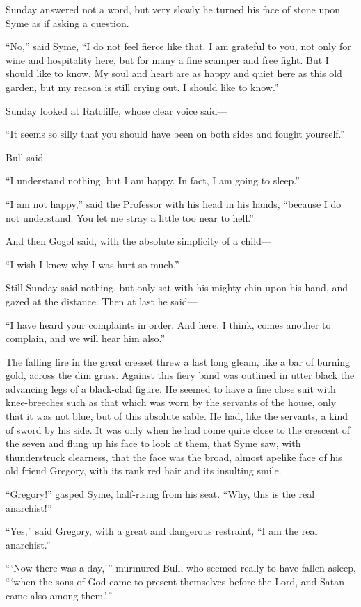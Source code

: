 Sunday answered not a word, but very slowly he turned his face of stone upon Syme as if asking a question.

“No,” said Syme, “I do not feel fierce like that. I am grateful to you, not only for wine and hospitality here, but for many a fine scamper and free fight. But I should like to know. My soul and heart are as happy and quiet here as this old garden, but my reason is still crying out. I should like to know.”

Sunday looked at Ratcliffe, whose clear voice said⁠—

“It seems so silly that you should have been on both sides and fought yourself.”

Bull said⁠—

“I understand nothing, but I am happy. In fact, I am going to sleep.”

“I am not happy,” said the Professor with his head in his hands, “because I do not understand. You let me stray a little too near to hell.”

And then Gogol said, with the absolute simplicity of a child⁠—

“I wish I knew why I was hurt so much.”

Still Sunday said nothing, but only sat with his mighty chin upon his hand, and gazed at the distance. Then at last he said⁠—

“I have heard your complaints in order. And here, I think, comes another to complain, and we will hear him also.”

The falling fire in the great cresset threw a last long gleam, like a bar of burning gold, across the dim grass. Against this fiery band was outlined in utter black the advancing legs of a black-clad figure. He seemed to have a fine close suit with knee-breeches such as that which was worn by the servants of the house, only that it was not blue, but of this absolute sable. He had, like the servants, a kind of sword by his side. It was only when he had come quite close to the crescent of the seven and flung up his face to look at them, that Syme saw, with thunderstruck clearness, that the face was the broad, almost apelike face of his old friend Gregory, with its rank red hair and its insulting smile.

“Gregory!” gasped Syme, half-rising from his seat. “Why, this is the real anarchist!”

“Yes,” said Gregory, with a great and dangerous restraint, “I am the real anarchist.”

“ ‘Now there was a day,’ ” murmured Bull, who seemed really to have fallen asleep, “ ‘when the sons of God came to present themselves before the Lord, and Satan came also among them.’ ”

